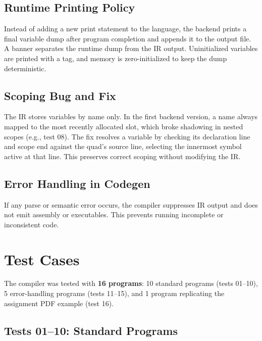 \documentclass[11pt]{article}
\begin{document}
\subsection{Runtime Printing Policy}

Instead of adding a new print statement to the language, the backend prints a final variable dump after program completion and appends it to the output file. A banner separates the runtime dump from the IR output. Uninitialized variables are printed with a tag, and memory is zero-initialized to keep the dump deterministic.

\subsection{Scoping Bug and Fix}

The IR stores variables by name only. In the first backend version, a name always mapped to the most recently allocated slot, which broke shadowing in nested scopes (e.g., test 08). The fix resolves a variable by checking its declaration line and scope end against the quad's source line, selecting the innermost symbol active at that line. This preserves correct scoping without modifying the IR.

\subsection{Error Handling in Codegen}

If any parse or semantic error occurs, the compiler suppresses IR output and does not emit assembly or executables. This prevents running incomplete or inconsistent code.

\section{Test Cases}

The compiler was tested with \textbf{16 programs}: 10 standard programs (tests 01--10), 5 error-handling programs (tests 11--15), and 1 program replicating the assignment PDF example (test 16).

\subsection{Tests 01--10: Standard Programs}
\end{document}
